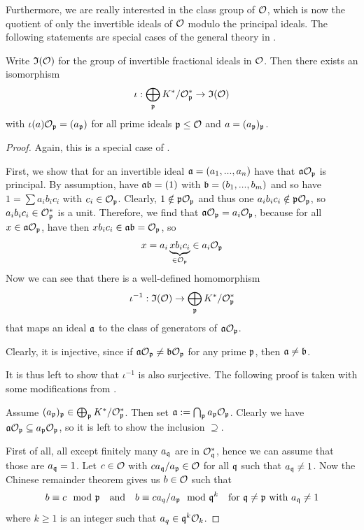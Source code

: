 Furthermore, we are really interested in the class group of $\mathcal{O}$, which is now the quotient of only the invertible ideals of $\mathcal{O}$ modulo the principal ideals.
The following statements are special cases of the general theory in \cite[Chapter I.§12]{neukirch}.
\begin{lemma}
    \label{prop:invertible_ideal_characterization}
    Write $\mathfrak{I}(\mathcal{O})$ for the group of invertible fractional ideals in $\mathcal{O}$.
    Then there exists an isomorphism
    \begin{equation*}
        \iota: \bigoplus_{\mathfrak{p}} K^*/\mathcal{O}_{\mathfrak{p}}^* \to \mathfrak{I}(\mathcal{O})
    \end{equation*}
    with $\iota(a)\mathcal{O}_{\mathfrak{p}} = (a_{\mathfrak{p}})$ for all prime ideals $\mathfrak{p} \leq \mathcal{O}$ and $a = (a_{\mathfrak{p}})_{\mathfrak{p}}$.
\end{lemma}
\begin{proof}
    Again, this is a special case of \cite[Prop.~I.12.9]{neukirch}.

    First, we show that for an invertible ideal $\mathfrak{a} = (a_1, ..., a_n)$ have that $\mathfrak{a}\mathcal{O}_{\mathfrak{p}}$ is principal.
    By assumption, have $\mathfrak{a}\mathfrak{b} = (1)$ with $\mathfrak{b} = (b_1, ..., b_m)$ and so have $1 = \sum a_i b_i c_i$ with $c_i \in \mathcal{O}_{\mathfrak{p}}$.
    Clearly, $1 \notin \mathfrak{p}\mathcal{O}_{\mathfrak{p}}$ and thus one $a_i b_i c_i \notin \mathfrak{p}\mathcal{O}_{\mathfrak{p}}$, so $a_i b_i c_i \in \mathcal{O}_{\mathfrak{p}}^*$ is a unit.
    Therefore, we find that $\mathfrak{a}\mathcal{O}_{\mathfrak{p}} = a_i\mathcal{O}_{\mathfrak{p}}$, because for all $x \in \mathfrak{a}\mathcal{O}_{\mathfrak{p}}$, have then $x b_i c_i \in \mathfrak{a}\mathfrak{b} = \mathcal{O}_{\mathfrak{p}}$, so
    \begin{equation*}
        x = a_i \underbrace{x b_i c_i}_{\in \mathcal{O}_{\mathfrak{p}}} \in a_i \mathcal{O}_{\mathfrak{p}}
    \end{equation*}
    Now we can see that there is a well-defined homomorphism
    \begin{equation*}
        \iota^{-1}: \mathfrak{I}(\mathcal{O}) \to \bigoplus_{\mathfrak{p}} K^*/\mathcal{O}_{\mathfrak{p}}^*
    \end{equation*}
    that maps an ideal $\mathfrak{a}$ to the class of generators of $\mathfrak{a}\mathcal{O}_{\mathfrak{p}}$.
    
    Clearly, it is injective, since if $\mathfrak{a}\mathcal{O}_{\mathfrak{p}} \neq \mathfrak{b}\mathcal{O}_{\mathfrak{p}}$ for any prime $\mathfrak{p}$, then $\mathfrak{a} \neq \mathfrak{b}$.

    It is thus left to show that $\iota^{-1}$ is also surjective.
    The following proof is taken with some modifications from \cite[Prop.~I.12.2]{neukirch}.

    Assume $(a_{\mathfrak{p}})_{\mathfrak{p}} \in \bigoplus_{\mathfrak{p}} K^*/\mathcal{O}_{\mathfrak{p}}^*$.
    Then set $\mathfrak{a} := \bigcap_{\mathfrak{p}} a_{\mathfrak{p}} \mathcal{O}_{\mathfrak{p}}$.
    Clearly we have $\mathfrak{a}\mathcal{O}_{\mathfrak{p}} \subseteq a_{\mathfrak{p}}\mathcal{O}_{\mathfrak{p}}$, so it is left to show the inclusion $\supseteq$.

    First of all, all except finitely many $a_{\mathfrak{q}}$ are in $\mathcal{O}_{\mathfrak{q}}^*$, hence we can assume that those are $a_{\mathfrak{q}} = 1$.
    Let $c \in \mathcal{O}$ with $ca_{\mathfrak{q}}/a_{\mathfrak{p}} \in \mathcal{O}$ for all $\mathfrak{q}$ such that $a_{\mathfrak{q}} \neq 1$.
    Now the Chinese remainder theorem gives us $b \in \mathcal{O}$ such that
    \begin{equation*}
        b \equiv c \mod {\mathfrak{p}} \quad \text{and} \quad b \equiv ca_q/a_{\mathfrak{p}} \mod {\mathfrak{q}}^k \quad \text{for $\mathfrak{q} \neq \mathfrak{p}$ with $a_{\mathfrak{q}} \neq 1$}
    \end{equation*}
    where $k \geq 1$ is an integer such that $a_q \in \mathfrak{q}^k\mathcal{O}_k$.


\end{proof}

